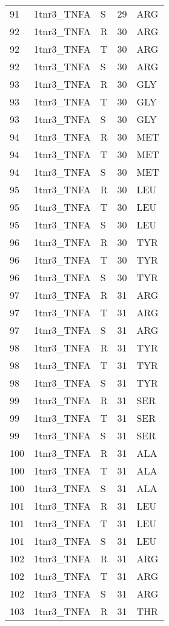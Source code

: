 \begin{longtable}[l]{l|l|l|l|l}
	91 & 1tnr3_TNFA & S & 29 & ARG \\
	92 & 1tnr3_TNFA & R & 30 & ARG \\
	92 & 1tnr3_TNFA & T & 30 & ARG \\
	92 & 1tnr3_TNFA & S & 30 & ARG \\
	93 & 1tnr3_TNFA & R & 30 & GLY \\
	93 & 1tnr3_TNFA & T & 30 & GLY \\
	93 & 1tnr3_TNFA & S & 30 & GLY \\
	94 & 1tnr3_TNFA & R & 30 & MET \\
	94 & 1tnr3_TNFA & T & 30 & MET \\
	94 & 1tnr3_TNFA & S & 30 & MET \\
	95 & 1tnr3_TNFA & R & 30 & LEU \\
	95 & 1tnr3_TNFA & T & 30 & LEU \\
	95 & 1tnr3_TNFA & S & 30 & LEU \\
	96 & 1tnr3_TNFA & R & 30 & TYR \\
	96 & 1tnr3_TNFA & T & 30 & TYR \\
	96 & 1tnr3_TNFA & S & 30 & TYR \\
	97 & 1tnr3_TNFA & R & 31 & ARG \\
	97 & 1tnr3_TNFA & T & 31 & ARG \\
	97 & 1tnr3_TNFA & S & 31 & ARG \\
	98 & 1tnr3_TNFA & R & 31 & TYR \\
	98 & 1tnr3_TNFA & T & 31 & TYR \\
	98 & 1tnr3_TNFA & S & 31 & TYR \\
	99 & 1tnr3_TNFA & R & 31 & SER \\
	99 & 1tnr3_TNFA & T & 31 & SER \\
	99 & 1tnr3_TNFA & S & 31 & SER \\
	100 & 1tnr3_TNFA & R & 31 & ALA \\
	100 & 1tnr3_TNFA & T & 31 & ALA \\
	100 & 1tnr3_TNFA & S & 31 & ALA \\
	101 & 1tnr3_TNFA & R & 31 & LEU \\
	101 & 1tnr3_TNFA & T & 31 & LEU \\
	101 & 1tnr3_TNFA & S & 31 & LEU \\
	102 & 1tnr3_TNFA & R & 31 & ARG \\
	102 & 1tnr3_TNFA & T & 31 & ARG \\
	102 & 1tnr3_TNFA & S & 31 & ARG \\
	103 & 1tnr3_TNFA & R & 31 & THR \\

\end{longtable}

